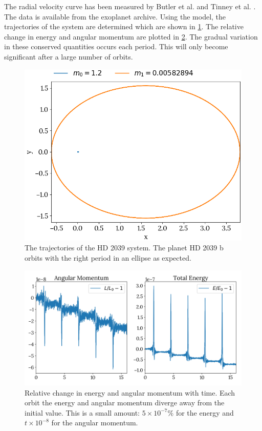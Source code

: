 \documentclass{physics_article_B}
\begin{document}
The radial velocity curve has been measured by Butler et al. \cite{butler_catalog_2006} and Tinney et al. \cite{tinney_four_2003}. The data is available from the exoplanet archive. Using the model, the trajectories of the system are determined which are shown in \cref{fig:hd2039}. The relative change in energy and angular momentum are plotted in \cref{fig:hd2039stats}. The gradual variation in these conserved quantities occurs each period. This will only become significant after a large number of orbits.

\begin{figure}[H]
 \centering
 \includegraphics[width=0.6\linewidth]{hd2039.png}
 \caption{The trajectories of the HD 2039 system. The planet HD 2039 b orbits with the right period in an ellipse as expected.}
 \label{fig:hd2039}
\end{figure}

\begin{figure}[H]
 \centering
 \includegraphics[width=\linewidth]{HD2039Stats.png}
 \caption{Relative change in energy and angular momentum with time. Each orbit the energy and angular momentum diverge away from the initial value. This is a small amount: $5\times10^{-7}\%$ for the energy and $t\times10^{-8}$ for the angular momentum. }
 \label{fig:hd2039stats}
\end{figure}
\end{document}
